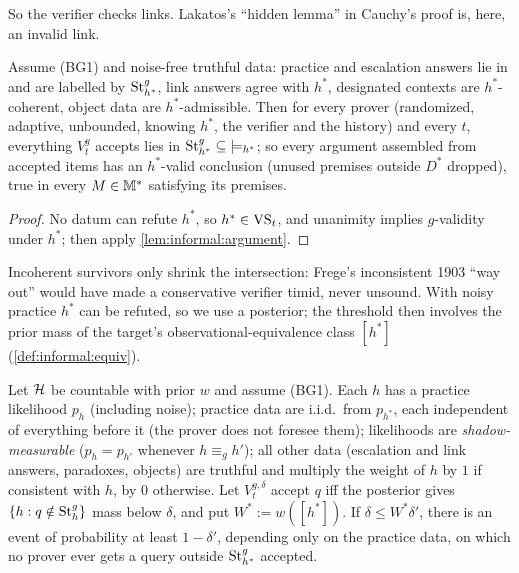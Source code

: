 So the verifier checks links. Lakatos's ``hidden lemma'' in Cauchy's proof \citep[App.~1]{lakatos1976proofs} is, here, an invalid link.

\begin{theorem}\label{thm:informal:soundness}
Assume (BG1) and noise-free truthful data: practice and escalation answers lie in and are labelled by $\mathrm{St}^{g}_{h^*}$, link answers agree with $h^*$, designated contexts are $h^*$-coherent, object data are $h^*$-admissible. Then for every prover (randomized, adaptive, unbounded, knowing $h^*$, the verifier and the history) and every $t$, everything $V^g_t$ accepts lies in $\mathrm{St}^{g}_{h^*}\subseteq{\models_{h^*}}$; so every argument assembled from accepted items has an $h^*$-valid conclusion (unused premises outside $D^*$ dropped), true in every $M\in\mathbb M^*$ satisfying its premises.
\end{theorem}

\begin{proof}
No datum can refute $h^*$, so $h^*\in\mathrm{VS}_t$, and unanimity implies $g$-validity under $h^*$; then apply \cref{lem:informal:argument}.
\end{proof}

Incoherent survivors only shrink the intersection: Frege's inconsistent 1903 ``way out'' \citep{quine1955frege} would have made a conservative verifier timid, never unsound. With noisy practice $h^*$ can be refuted, so we use a posterior; the threshold then involves the prior mass of the target's observational-equivalence class $[h^*]$ (\cref{def:informal:equiv}).

\begin{theorem}\label{thm:informal:ville}
Let $\mathcal{H}$ be countable with prior $w$ and assume (BG1). Each $h$ has a practice likelihood $p_h$ (including noise); practice data are i.i.d.\ from $p_{h^*}$, each independent of everything before it (the prover does not foresee them); likelihoods are \emph{shadow-measurable} ($p_h=p_{h'}$ whenever $h\equiv_gh'$); all other data (escalation and link answers, paradoxes, objects) are truthful and multiply the weight of $h$ by $1$ if consistent with $h$, by $0$ otherwise. Let $V^{g,\delta}_t$ accept $q$ iff the posterior gives $\{h:q\notin\mathrm{St}^{g}_{h}\}$ mass below $\delta$, and put $W^*:=w([h^*])$. If $\delta\le W^*\delta'$, there is an event of probability at least $1-\delta'$, depending only on the practice data, on which no prover ever gets a query outside $\mathrm{St}^{g}_{h^*}$ accepted.
\end{theorem}

